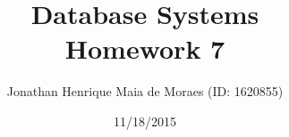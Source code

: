 \title{Database Systems \\ Homework 7}
\author{Jonathan Henrique Maia de Moraes (ID: 1620855)}
\date{11/18/2015}
\maketitle
